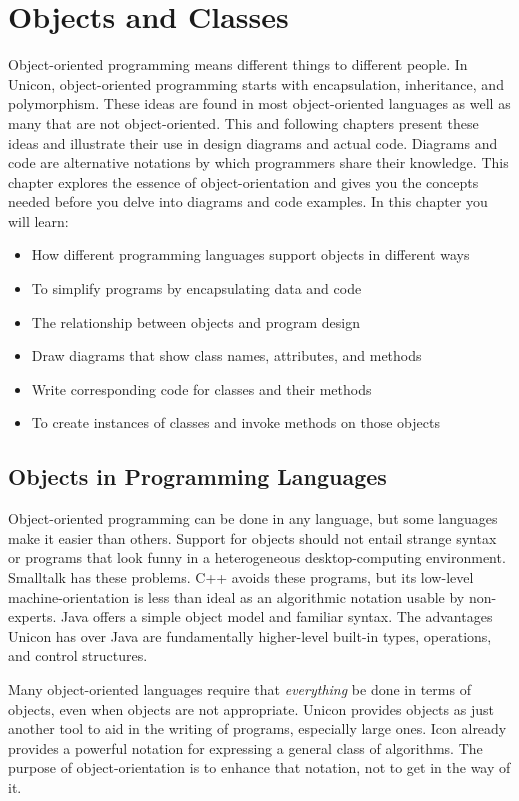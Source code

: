 \chapter{Objects and Classes}

Object-oriented programming means
different things to different people. In Unicon, object-oriented
programming starts with encapsulation, inheritance, and polymorphism.
These ideas are found in most object-oriented languages as well as many
that are not object-oriented. This and following chapters
present these ideas and illustrate their use in design diagrams and
actual code. Diagrams and code are
alternative notations by which programmers share their knowledge. This
chapter explores the essence of object-orientation and gives you the
concepts needed before you delve into diagrams and code examples. In
this chapter you will learn:
\begin{itemize}\itemsep0pt
\item How different programming languages support objects in different ways
\item To simplify programs by encapsulating data and code
\item The relationship between objects and program design
\item Draw diagrams that show class names, attributes, and methods
\item Write corresponding code for classes and their methods
\item To create instances of classes and invoke methods on those objects
\end{itemize}

\section{Objects in Programming Languages}

Object-oriented programming can be done in any language, but some
languages make it easier than others. Support for objects should not
entail strange syntax or programs that look funny in a
heterogeneous desktop-computing environment. Smalltalk
has these problems. C++ avoids these programs, but its low-level
machine-orientation is less than ideal as an algorithmic
notation usable by non-experts. Java offers a simple object
model and familiar syntax. The advantages
Unicon has over Java are fundamentally higher-level built-in types,
operations, and control structures.

Many object-oriented languages require that \textit{everything} be done
in terms of objects, even when objects are not appropriate. Unicon
provides objects as just another tool to aid in the writing of
programs, especially large ones. Icon already provides a powerful
notation for expressing a general class of algorithms. The purpose of
object-orientation is to enhance that notation, not to get in the way
of it.

